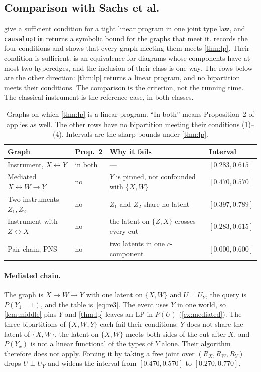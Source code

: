 \subsection{Comparison with Sachs et al.}
\label{app:sachs}

\citet[Proposition~2]{symbolicbounds2023general} give a sufficient condition
for a tight linear program in one joint type law, and \texttt{causaloptim}
returns a symbolic bound for the graphs that meet it. 
records the four conditions and shows that every graph meeting them meets
\cref{thm:lp}. Their condition is sufficient.  is an equivalence
for diagrams whose components have at most two hyperedges, and the inclusion
of their class is one way. The rows below are the other direction: \cref{thm:lp} returns a linear program, and no
bipartition meets their conditions. The comparison is the criterion, not the
running time. The classical instrument is the reference case, in both
classes.

\begin{table}[ht]
\centering
\caption{Graphs on which \cref{thm:lp} is a linear program.
``In both'' means Proposition~2 of \citet{symbolicbounds2023general} applies
as well. The other rows have no bipartition meeting their conditions
(1)--(4). Intervals are the sharp bounds under \cref{thm:lp}.}
\label{tab:sachs}
\small
\begin{tabular}{@{}p{}lp{}l@{}}
\toprule
Graph & Prop.~2 & Why it fails & Interval \\
\midrule
Instrument, $X\leftrightarrow Y$ & in both & --- & $[0.283,0.615]$ \\
Mediated $X\leftrightarrow W\to Y$ & no & $Y$ is pinned, not confounded with $\{X,W\}$ & $[0.470,0.570]$ \\
Two instruments $Z_1,Z_2$ & no & $Z_1$ and $Z_2$ share no latent & $[0.397,0.789]$ \\
Instrument with $Z\leftrightarrow X$ & no & the latent on $\{Z,X\}$ crosses every cut & $[0.283,0.615]$ \\
Pair chain, PNS & no & two latents in one $c$-component & $[0.000,0.600]$ \\
\bottomrule
\end{tabular}
\end{table}

\paragraph{Mediated chain.}
The graph is $X\to W\to Y$ with one latent on $\{X,W\}$ and $U\perp U_Y$,
the query is $P(Y_1{=}1)$, and the table is~\eqref{eq:re3}. The event uses
$Y$ in one world, so \cref{lem:middle} pins $Y$ and \cref{thm:lp} leaves an
LP in $P(U)$ (\cref{ex:mediated}). The three bipartitions of $\{X,W,Y\}$ each
fail their conditions: $Y$ does not share the latent of $\{X,W\}$, the latent
on $\{X,W\}$ meets both sides of the cut after $X$, and $P(Y_x)$ is not a
linear functional of the types of $Y$ alone. Their algorithm therefore does
not apply. Forcing it by taking a free joint over $(R_X,R_W,R_Y)$ drops
$U\perp U_Y$ and widens the interval from $[0.470,0.570]$ to
$[0.270,0.770]$.


